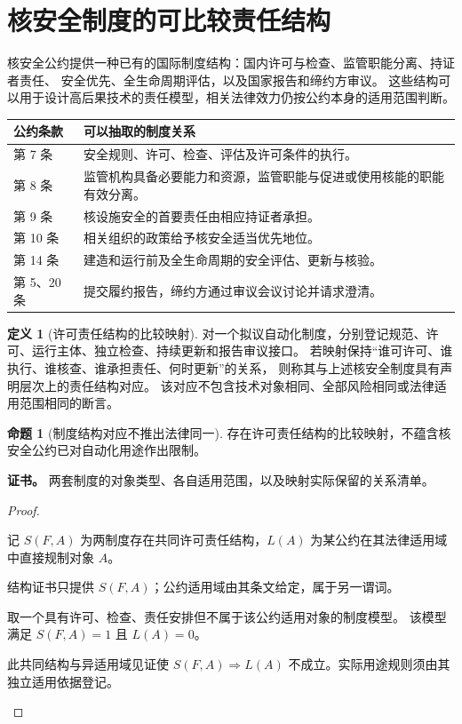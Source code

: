 \documentclass[UTF8,12pt,a4paper,openany,fontset=none,zihao=false]{ctexrep}
\theoremstyle{definition}
\newtheorem{definition}{定义}[chapter]
\newtheorem{proposition}{命题}[chapter]
\newenvironment{certificate}{\par\noindent\textbf{证书。}\ignorespaces}{\par}
\newcommand{\1}{\mathbf 1}
\begin{document}
\section{核安全制度的可比较责任结构}

核安全公约提供一种已有的国际制度结构：国内许可与检查、监管职能分离、持证者责任、
安全优先、全生命周期评估，以及国家报告和缔约方审议\cite{IAEACNS}。
这些结构可以用于设计高后果技术的责任模型，相关法律效力仍按公约本身的适用范围判断。

\begin{center}
\begin{tabular}{p{}p{}}
\toprule
公约条款 & 可以抽取的制度关系 \\
\midrule
第 7 条 & 安全规则、许可、检查、评估及许可条件的执行。\\
第 8 条 & 监管机构具备必要能力和资源，监管职能与促进或使用核能的职能有效分离。\\
第 9 条 & 核设施安全的首要责任由相应持证者承担。\\
第 10 条 & 相关组织的政策给予核安全适当优先地位。\\
第 14 条 & 建造和运行前及全生命周期的安全评估、更新与核验。\\
第 5、20 条 & 提交履约报告，缔约方通过审议会议讨论并请求澄清。\\
\bottomrule
\end{tabular}
\end{center}

\begin{definition}[许可责任结构的比较映射]
\label{gov:nuclear-map}
对一个拟议自动化制度，分别登记规范、许可、运行主体、独立检查、持续更新和报告审议接口。
若映射保持“谁可许可、谁执行、谁核查、谁承担责任、何时更新”的关系，
则称其与上述核安全制度具有声明层次上的责任结构对应。
该对应不包含技术对象相同、全部风险相同或法律适用范围相同的断言。
\end{definition}

\begin{proposition}[制度结构对应不推出法律同一]
\label{gov:no-legal-identity}
存在许可责任结构的比较映射，不蕴含核安全公约已对自动化用途作出限制。
\end{proposition}
\begin{certificate}
两套制度的对象类型、各自适用范围，以及映射实际保留的关系清单。
\end{certificate}
\begin{proof}
\begin{semanticsteps}
\item 记 \(S(F,A)\) 为两制度存在共同许可责任结构，\(L(A)\) 为某公约在其法律适用域中直接规制对象 \(A\)。
\item 结构证书只提供 \(S(F,A)\)；公约适用域由其条文给定，属于另一谓词。
\item 取一个具有许可、检查、责任安排但不属于该公约适用对象的制度模型。
该模型满足 \(S(F,A)=1\) 且 \(L(A)=0\)。
\item 此共同结构与异适用域见证使
\(S(F,A)\Rightarrow L(A)\) 不成立。实际用途规则须由其独立适用依据登记。
\end{semanticsteps}
\end{proof}
\end{document}
